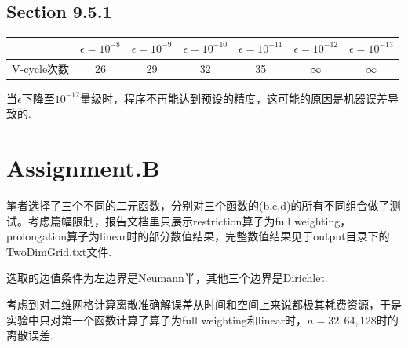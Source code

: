 \documentclass[a4paper,11.5pt,UTF8]{ctexart}
\begin{document}
\begin{large}
\subsection{Section 9.5.1 \uppercase\expandafter{}}
\begin{center}
	\begin{tabular}{|c|c|c|c|c|c|c|}
		\hline
		 & $\epsilon=10^{-8}$ & $\epsilon=10^{-9}$ & $\epsilon=10^{-10}$ & $\epsilon=10^{-11}$ & $\epsilon=10^{-12}$ & $\epsilon=10^{-13}$ \\
		 \hline
		 V-cycle次数 & 26 & 29 & 32 & 35 & $\infty$ & $\infty$ \\
		 \hline
	\end{tabular}
\end{center}
当$\epsilon$下降至$10^{-12}$量级时，程序不再能达到预设的精度，这可能的原因是机器误差导致的.

\section{Assignment.B}
\par 笔者选择了三个不同的二元函数，分别对三个函数的(b,c,d)的所有不同组合做了测试。考虑篇幅限制，报告文档里只展示restriction算子为full weighting，prolongation算子为linear时的部分数值结果，完整数值结果见于output目录下的TwoDimGrid.txt文件.
\par 选取的边值条件为左边界是Neumann半，其他三个边界是Dirichlet.
\par 考虑到对二维网格计算离散准确解误差从时间和空间上来说都极其耗费资源，于是实验中只对第一个函数计算了算子为full weighting和linear时，$n=32,64,128$时的离散误差.


\end{large}
\end{document}
